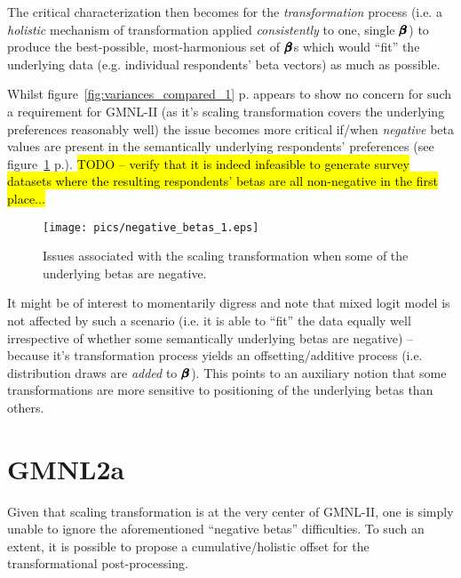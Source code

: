 \documentclass[12pt,a4paper]{article}
\begin{document}
The critical characterization then becomes for the \textit{transformation} process (i.e. a \textit{holistic} mechanism of transformation applied \textit{consistently} to one, single \(\pmb{\hm{\beta}}\)) to produce the best-possible, most-harmonious set of \(\pmb{\hm{\beta}}\)s which would ``fit'' the underlying data (e.g. individual respondents' beta vectors) as much as possible.

Whilst figure~\ref{fig:variances_compared_1} p.\pageref{fig:variances_compared_1} appears to show no concern for such a requirement for GMNL-II (as it's scaling transformation covers the underlying preferences reasonably well) the issue becomes more critical if/when \textit{negative} beta values are present in the semantically underlying respondents' preferences (see figure~\ref{fig:negative_betas_1} p.\pageref{fig:negative_betas_1}). \hl{TODO -- verify that it is indeed infeasible to generate survey datasets where the resulting respondents' betas are all non-negative in the first place...}


\begin{figure}[H]
\begin{framed}
\texttt{[image: pics/negative\_betas\_1.eps]}


\caption{Issues associated with the scaling transformation when some of the underlying betas are negative.} 

\label{fig:negative_betas_1}
\end{framed}
\end{figure}

It might be of interest to momentarily digress and note that mixed logit model is not affected by such a scenario (i.e. it is able to ``fit'' the data equally well irrespective of whether some semantically underlying betas are negative) -- because it's transformation process yields an offsetting/additive process (i.e. distribution draws are \textit{added} to \(\pmb{\hm{\beta}}\)). This points to an auxiliary notion that some transformations are more sensitive to positioning of the underlying betas than others.


\section{GMNL2a}

Given that scaling transformation is at the very center of GMNL-II, one is simply unable to ignore the aforementioned ``negative betas'' difficulties. To such an extent, it is possible to propose a cumulative/holistic offset for the transformational post-processing. 
\end{document}
